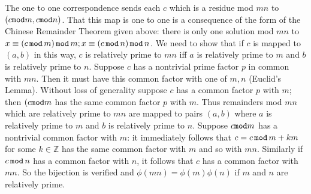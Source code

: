 \documentclass[12pt]{article}
\begin{document}
The one to one correspondence sends each $c$ which is a residue mod $mn$ to $(c {\tt mod}m,c{\tt mod}n)$.  That this map is one to one is a consequence of the form of the Chinese Remainder Theorem given above:  there is only one solution mod $mn$ to $x \equiv (c\,{\tt mod}\,m)\, {\tt mod}\, m; x \equiv (c\,{\tt mod}\, n)\,{\tt mod}\,n$.  We need to show that
if $c$ is mapped to $(a,b)$ in this way, $c$ is relatively prime to $mn$ iff $a$ is relatively prime to $m$ and $b$ is relatively prime to $n$.  Suppose $c$ has a nontrivial prime factor $p$ in common with $mn$.  Then it must have this common factor with one of $m,n$ (Euclid's Lemma).  Without loss of generality suppose $c$ has a common factor $p$ with $m$;  then $(c {\tt mod}m$ has the same common factor $p$ with $m$.  Thus remainders mod $mn$ which are relatively prime to $mn$ are mapped to pairs $(a,b)$ where $a$ is relatively prime to $m$
and $b$ is relatively prime to $n$.  Suppose $c {\tt mod} m$ has a nontrivial common factor with $m$:  it immediately follows that $c = c \,{\tt mod} \,m+km$ for some $k \in \mathbb Z$ has the same common factor with $m$ and so with $mn$.  Similarly if $c \,{\tt mod}\, n$ has a common factor with $n$, it follows that $c$ has a common factor with $mn$.  So the bijection is verified and $\phi(mn) = \phi(m)\phi(n)$ if $m$ and $n$ are relatively prime.
\end{document}
